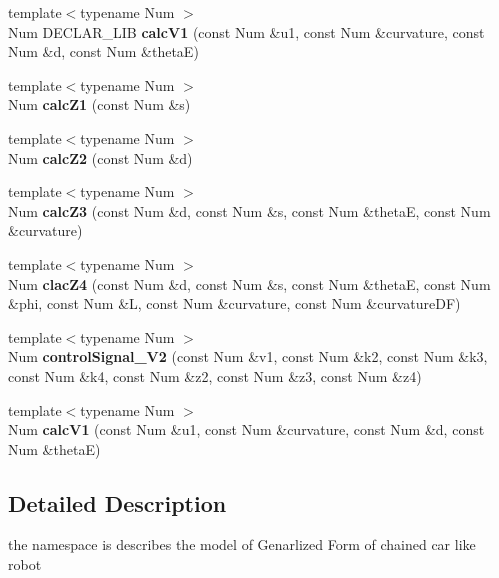 \begin{DoxyCompactItemize}
\item 
\mbox{\label{namespace_path_1_1_r_control_ad9e2cb67c7695a6c57c48e0b272eea5b}} 
{\footnotesize template$<$typename Num $>$ }\\Num D\+E\+C\+L\+A\+R\+\_\+\+L\+IB {\bfseries calc\+V1} (const Num \&u1, const Num \&curvature, const Num \&d, const Num \&thetaE)
\item 
\mbox{\label{namespace_path_1_1_r_control_a90c8fb9a17cb0e427aa59817b501e6bc}} 
{\footnotesize template$<$typename Num $>$ }\\Num {\bfseries calc\+Z1} (const Num \&s)
\item 
\mbox{\label{namespace_path_1_1_r_control_adec01dfbe0a25b231d4c1d54a1989b1f}} 
{\footnotesize template$<$typename Num $>$ }\\Num {\bfseries calc\+Z2} (const Num \&d)
\item 
\mbox{\label{namespace_path_1_1_r_control_a039ab9e3f03f77274b4547d2f430eeb1}} 
{\footnotesize template$<$typename Num $>$ }\\Num {\bfseries calc\+Z3} (const Num \&d, const Num \&s, const Num \&thetaE, const Num \&curvature)
\item 
\mbox{\label{namespace_path_1_1_r_control_aaf4ae8618fb2545cf50a7d97dadea831}} 
{\footnotesize template$<$typename Num $>$ }\\Num {\bfseries clac\+Z4} (const Num \&d, const Num \&s, const Num \&thetaE, const Num \&phi, const Num \&L, const Num \&curvature, const Num \&curvature\+DF)
\item 
\mbox{\label{namespace_path_1_1_r_control_a21b616a625b29729da47a39137ec1b65}} 
{\footnotesize template$<$typename Num $>$ }\\Num {\bfseries control\+Signal\+\_\+\+V2} (const Num \&v1, const Num \&k2, const Num \&k3, const Num \&k4, const Num \&z2, const Num \&z3, const Num \&z4)
\item 
\mbox{\label{namespace_path_1_1_r_control_a0ab88e6eaa7684d5c381effb50160261}} 
{\footnotesize template$<$typename Num $>$ }\\Num {\bfseries calc\+V1} (const Num \&u1, const Num \&curvature, const Num \&d, const Num \&thetaE)
\end{DoxyCompactItemize}


\subsection{Detailed Description}
the namespace is describes the model of Genarlized Form of chained car like robot 

